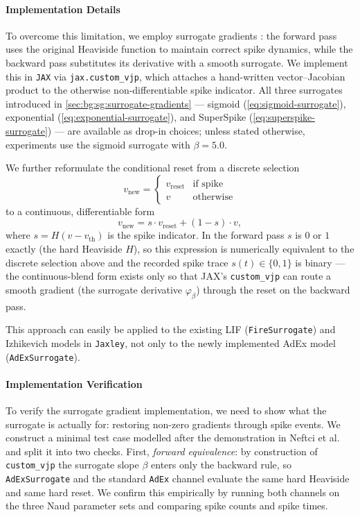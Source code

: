 \paragraph{Implementation Details}\label{sec:method:surrogate-gradients:implementation}
To overcome this limitation, we employ surrogate gradients \cite{Neftci2019}: the forward pass uses the original Heaviside function to maintain correct spike dynamics, while the backward pass substitutes its derivative with a smooth surrogate.
We implement this in \texttt{JAX} via \texttt{jax.custom\_vjp}, which attaches a hand-written vector--Jacobian product to the otherwise non-differentiable spike indicator.
All three surrogates introduced in \cref{sec:bg:sg:surrogate-gradients} --- sigmoid (\cref{eq:sigmoid-surrogate}), exponential (\cref{eq:exponential-surrogate}), and SuperSpike (\cref{eq:superspike-surrogate}) --- are available as drop-in choices; unless stated otherwise, experiments use the sigmoid surrogate with $\beta = 5.0$.

We further reformulate the conditional reset from a discrete selection
\begin{equation}
    v_{\text{new}} = \begin{cases} v_{\text{reset}} & \text{if spike} \\ v & \text{otherwise} \end{cases}
\end{equation}
to a continuous, differentiable form
\begin{equation}
    v_{\text{new}} = s \cdot v_{\text{reset}} + (1 - s) \cdot v,
\end{equation}
where $s = H(v - v_{\text{th}})$ is the spike indicator.
In the forward pass $s$ is $0$ or $1$ exactly (the hard Heaviside $H$), so this expression is numerically equivalent to the discrete selection above and the recorded spike trace $s(t)\in\{0,1\}$ is binary --- the continuous-blend form exists only so that JAX's \texttt{custom\_vjp} can route a smooth gradient (the surrogate derivative $\varphi_\beta$) through the reset on the backward pass.

This approach can easily be applied to the existing \gls{LIF} (\texttt{Fire\-Surrogate}) and Izhikevich models in \texttt{Jax\-ley},
not only to the newly implemented \gls{AdEx} model (\texttt{AdEx\-Surro\-gate}).

\paragraph{Implementation Verification}\label{sec:method:surrogate-gradients:verification}
To verify the surrogate gradient implementation, we need to show what the surrogate is actually for: restoring non-zero gradients through spike events.
We construct a minimal test case modelled after the demonstration in Neftci et al.~\cite{Neftci2019} and split it into two checks.
First, \emph{forward equivalence}: by construction of \texttt{custom\_vjp} the surrogate slope $\beta$ enters only the backward rule, so \texttt{AdExSurrogate} and the standard \texttt{AdEx} channel evaluate the same hard Heaviside and same hard reset.
We confirm this empirically by running both channels on the three Naud parameter sets and comparing spike counts and spike times.

